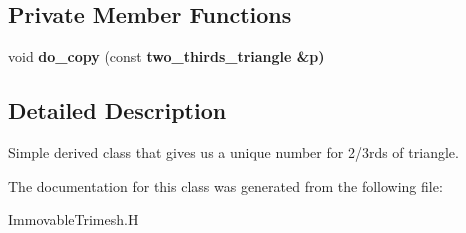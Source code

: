 \subsection*{Private Member Functions}
\begin{CompactItemize}
\item 
void \textbf{do\_\-copy} (const \bf{two\_\-thirds\_\-triangle} \&p)\label{classASCbase_1_1geometry_1_1two__thirds__triangle_590f608270791925a9e65210cd3bcc26}

\end{CompactItemize}


\subsection{Detailed Description}
Simple derived class that gives us a unique number for 2/3rds of triangle. 



The documentation for this class was generated from the following file:\begin{CompactItemize}
\item 
Immovable\-Trimesh.H\end{CompactItemize}
